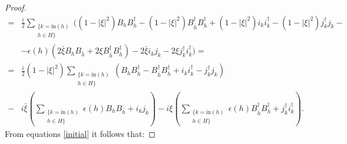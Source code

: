\documentclass[12pt,oneside,reqno]{amsart}
\theoremstyle{definition}
\numberwithin{equation}{section}
\numberwithin{theorem}{section}
\newcommand{\h}{\mathfrak{H}}
\renewcommand{\d}[1]{\ensuremath{\operatorname{d}\!{#1}}}
\renewcommand{\d}{\dagger}
\begin{document}
\begin{proof}
\begin{equation*}
\begin{split}
=& \frac{i}{2}\sum\limits_{\substack{\{k=\text{in}(h)\\ h\in H\}}} \Big((1-\lvert\xi\rvert ^2 )B_hB_h^\d -(1-\lvert\xi\rvert ^2) B_{\bar{h}}^\d B_h ^\d +(1-\lvert\xi\rvert ^2) i_k i_k^\d -(1-\lvert\xi\rvert ^2)j_k^\d j_k - \\
&- \epsilon (h) (2\bar \xi B_h B_{\bar{h}} +2\xi B_{\bar{h}}^\d B_h ^\d )-2\bar \xi i_kj_k - 2\xi j_k^\d i_k^\d \Big) = \\
=& \frac{i}{2}(1-\lvert\xi\rvert ^2)\sum\limits_{\substack{\{k=\text{in}(h)\\ h\in H\}}} (B_h B_h ^\d -B_{\bar{h}}^\d B_h ^\d +i_k i_k^\d-j_k^\d j_k) \\
-& i\bar \xi \left(\sum\limits_{\substack{\{k=\text{in}(h)\\ h\in H\}}} \epsilon (h)B_h B_{\bar{h}}+i_k j_k\right) -i\xi\left(\sum\limits_{\substack{\{k=\text{in}(h)\\h\in H\}}}\epsilon(h)B_{\bar{h}}^\d B_h^\d +j_k^\d i_k^\d \right).
\end{split}
\end{equation*}
%
From equations \eqref{initial} it follows that:


\end{proof}
\end{document}
